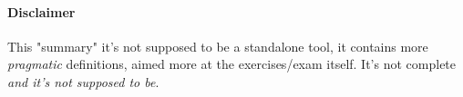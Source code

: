 \documentclass[11pt]{article}
\begin{document}
	\maketitle
	
	\paragraph{Disclaimer} This "summary" it's not supposed to be a standalone tool, it contains more \textit{pragmatic} definitions, aimed more at the exercises/exam itself. It's not complete \textit{and it's not supposed to be}.
	
	\tableofcontents
	\newpage
	
	
	
	
\end{document}
